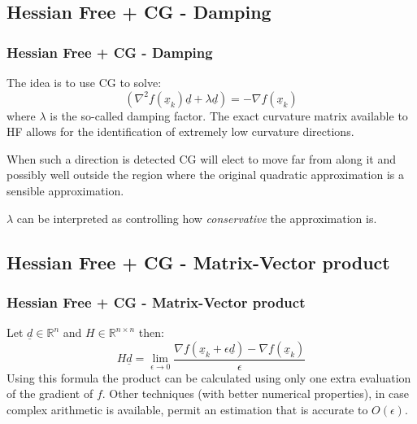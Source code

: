 \documentclass[professionalfont]{beamer}
\begin{document}
  \subsection{Hessian Free + CG - Damping}
  \begin{frame}
    \frametitle{Hessian Free + CG - Damping}
    The idea is to use CG to solve:
    \begin{equation*}
      (\nabla^{2} f(\underline{x}_k) \underline{d} + \lambda \underline{d}) = - \nabla f(\underline{x}_k)
    \end{equation*}
    where $\lambda$ is the so-called damping factor. The exact curvature matrix available to HF allows
    for the identification of extremely low curvature directions.\newline\newline

    When such a direction is detected CG will elect to move far from along it and possibly well outside the region
    where the original quadratic approximation is a sensible approximation.\newline\newline

    $\lambda$ can be interpreted as controlling how \textit{conservative} the approximation is.
  \end{frame}

  \subsection{Hessian Free + CG - Matrix-Vector product}
	\begin{frame}
	  \frametitle{Hessian Free + CG - Matrix-Vector product}
      Let $\underline{d} \in \mathbb{R}^{n}$ and $H \in \mathbb{R}^{n \times n}$ then:
      \begin{equation*}
        H\underline{d} = \lim_{\epsilon \rightarrow 0} \frac{\nabla f(\underline{x}_k + \epsilon \underline{d}) - \nabla f{(\underline{x}_k)}}{\epsilon}
      \end{equation*}
      Using this formula the product can be calculated using only one extra evaluation of the gradient of $f$.\newline\newline
      Other techniques (with better numerical properties), in case complex arithmetic is available, permit an estimation that is accurate
      to $O(\epsilon)$.

	\end{frame}
\end{document}
